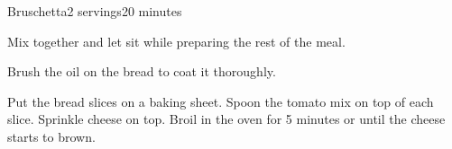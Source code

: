 \documentclass[../Cookbook.tex]{subfiles}
\begin{document}
\begin{recipe}[Bruschetta]{Bruschetta}{2 servings}{20 minutes}

Mix together and let sit while preparing the rest of the meal.

Brush the oil on the bread to coat it thoroughly.

Put the bread slices on a baking sheet.
Spoon the tomato mix on top of each slice.
Sprinkle cheese on top.
Broil in the oven for 5 minutes or until the cheese starts to brown.

\end{recipe}
\end{document}
